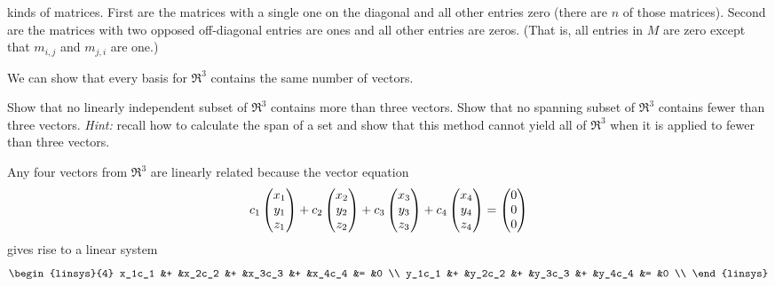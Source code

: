 \begin{exercises}
\begin{answer}
\begin{exparts}
           kinds of  matrices.
           First are the matrices with a single one on the diagonal and all
           other entries zero (there are \( n \) of those matrices).
           Second are the matrices with two opposed off-diagonal entries
           are ones and all other entries are zeros.
           (That is, all entries in $M$ are zero except that 
           $m_{i,j}$ and $m_{j,i}$ are one.) 
      \end{exparts}  
    \end{answer}
  \recommended \item  
     We can show that every basis for $\Re^3$ contains the same
     number of vectors.
     \begin{exparts}
       \partsitem Show that no linearly independent subset of $\Re^3$
          contains more than three vectors.
       \partsitem Show that 
          no spanning subset of $\Re^3$ contains fewer than three vectors.
          \textit{Hint:} 
          recall how to calculate the span of a set and show that
          this method 
          cannot yield all of $\Re^3$ when it is applied to fewer than
          three vectors.
     \end{exparts}
     \begin{answer}
       \begin{exparts}
         \partsitem Any four vectors from $\Re^3$ are linearly related because
           the vector equation
           \begin{equation*}
             c_1\begin{pmatrix} x_1 \\ y_1 \\ z_1 \end{pmatrix}
             +c_2\begin{pmatrix} x_2 \\ y_2 \\ z_2 \end{pmatrix}
             +c_3\begin{pmatrix} x_3 \\ y_3 \\ z_3 \end{pmatrix}
             +c_4\begin{pmatrix} x_4 \\ y_4 \\ z_4 \end{pmatrix}
             =\begin{pmatrix} 0 \\ 0 \\ 0 \end{pmatrix}
           \end{equation*}
           gives rise to a linear system
           \begin{equation*}
             \begin{linsys}{4}
                x_1c_1  &+  &x_2c_2  &+  &x_3c_3  &+  &x_4c_4  &=  &0 \\
                y_1c_1  &+  &y_2c_2  &+  &y_3c_3  &+  &y_4c_4  &=  &0 \\

\end{linsys}
\end{equation*}
\end{exparts}
\end{answer}
\end{exercises}
